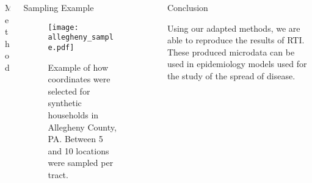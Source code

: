 \documentclass[final]{beamer}
\newlength{\sepwid}
\newlength{\onecolwid}
\newlength{\twocolwid}
\begin{document}
\begin{frame}[t]
\begin{columns}[t]
\begin{column}{\twocolwid}
\begin{columns}[t,totalwidth=\twocolwid]
\begin{column}{\onecolwid}
\begin{block}{Method}
\begin{enumerate}
\end{enumerate}

\end{block}


\end{column} %

\begin{column}{\onecolwid} %


\begin{block}{Sampling Example}

\begin{figure}\label{alleghenysampling}
\texttt{[image: allegheny\_sample.pdf]}
\caption{Example of how coordinates were selected for synthetic households in Allegheny County, PA.  Between 5 and 10 locations were sampled per tract.}
\end{figure}


\end{block}


\end{column} %

\end{columns} %

\end{column} %

\begin{column}{\sepwid}\end{column} %

\begin{column}{\onecolwid} %


\begin{block}{Conclusion}

Using our adapted methods, we are able to reproduce the results of RTI.  These produced microdata can be used in epidemiology models used for the study of the spread of disease.


\end{block}
\end{column}
\end{columns}
\end{frame}
\end{document}
